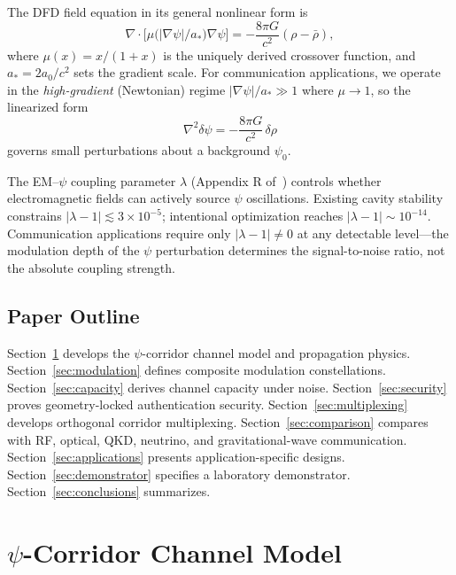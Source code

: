 \documentclass[twocolumn,superscriptaddress,prd,nofootinbib]{revtex4-2}
\newcommand{\astar}{a_*}
\begin{document}
The DFD field equation in its general nonlinear form is
\begin{equation}
\nabla \cdot \bigl[\mu\!\bigl(|\nabla\psi|/\astar\bigr)\nabla\psi\bigr]
= -\frac{8\pi G}{c^2}(\rho - \bar{\rho}),
\label{eq:field-eq}
\end{equation}
where $\mu(x) = x/(1+x)$ is the uniquely derived crossover function,
and $\astar = 2a_0/c^2$ sets the gradient scale.
For communication applications, we operate in the \emph{high-gradient}
(Newtonian) regime $|\nabla\psi|/\astar \gg 1$ where $\mu \to 1$,
so the linearized form
\begin{equation}
\nabla^2 \delta\psi = -\frac{8\pi G}{c^2}\,\delta\rho
\label{eq:linearized}
\end{equation}
governs small perturbations about a background $\psi_0$.

The EM--$\psi$ coupling parameter $\lambda$ (Appendix R
of~\cite{Alcock2025DFD}) controls whether electromagnetic fields can
actively source $\psi$ oscillations.
Existing cavity stability constrains $|\lambda - 1| \lesssim 3 \times 10^{-5}$;
intentional optimization reaches $|\lambda-1| \sim 10^{-14}$.
Communication applications require only $|\lambda - 1| \neq 0$ at any
detectable level---the modulation depth of the $\psi$ perturbation
determines the signal-to-noise ratio, not the absolute coupling strength.

\subsection{Paper Outline}

Section~\ref{sec:channel-model} develops the $\psi$-corridor channel
model and propagation physics.
Section~\ref{sec:modulation} defines composite modulation constellations.
Section~\ref{sec:capacity} derives channel capacity under noise.
Section~\ref{sec:security} proves geometry-locked authentication security.
Section~\ref{sec:multiplexing} develops orthogonal corridor multiplexing.
Section~\ref{sec:comparison} compares with RF, optical, QKD, neutrino,
and gravitational-wave communication.
Section~\ref{sec:applications} presents application-specific designs.
Section~\ref{sec:demonstrator} specifies a laboratory demonstrator.
Section~\ref{sec:conclusions} summarizes.

\section{$\psi$-Corridor Channel Model}\label{sec:channel-model}
\end{document}
